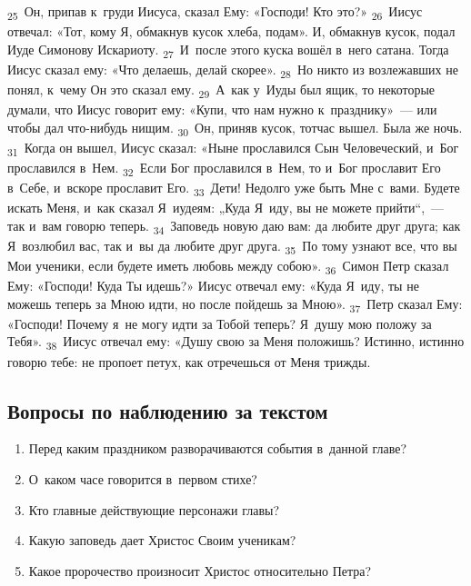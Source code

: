 \documentclass[a4paper,12pt]{article}
\begin{document}
\textsubscript{25}~Он, припав к~груди Иисуса, сказал Ему: «Господи! Кто это?»
\textsubscript{26}~Иисус отвечал: «Тот, кому Я, обмакнув кусок хлеба, подам». И, обмакнув кусок, подал Иуде Симонову Искариоту.
\textsubscript{27}~И~после этого куска вошёл в~него сатана. Тогда Иисус сказал ему: «Что делаешь, делай скорее».
\textsubscript{28}~Но никто из возлежавших не понял, к~чему Он это сказал ему.
\textsubscript{29}~А~как у~Иуды был ящик, то некоторые думали, что Иисус говорит ему: «Купи, что нам нужно к~празднику»~--- или чтобы дал что-нибудь нищим.
\textsubscript{30}~Он, приняв кусок, тотчас вышел. Была же ночь.
\textsubscript{31}~Когда он вышел, Иисус сказал: «Ныне прославился Сын Человеческий, и~Бог прославился в~Нем.
\textsubscript{32}~Если Бог прославился в~Нем, то и~Бог прославит Его в~Себе, и~вскоре прославит Его.
\textsubscript{33}~Дети! Недолго уже быть Мне с~вами. Будете искать Меня, и~как сказал Я~иудеям: „Куда Я~иду, вы не можете прийти“,~--- так и~вам говорю теперь.
\textsubscript{34}~Заповедь новую даю вам: да любите друг друга; как Я~возлюбил вас, так и~вы да любите друг друга.
\textsubscript{35}~По тому узнают все, что вы Мои ученики, если будете иметь любовь между собою».
\textsubscript{36}~Симон Петр сказал Ему: «Господи! Куда Ты идешь?» Иисус отвечал ему: «Куда Я~иду, ты не можешь теперь за Мною идти, но после пойдешь за Мною».
\textsubscript{37}~Петр сказал Ему: «Господи! Почему я~не могу идти за Тобой теперь? Я~душу мою положу за Тебя».
\textsubscript{38}~Иисус отвечал ему: «Душу свою за Меня положишь? Истинно, истинно говорю тебе: не пропоет петух, как отречешься от Меня трижды. 

\subsection*{Вопросы по наблюдению за текстом}
\begin{enumerate}
    \item Перед каким праздником разворачиваются события в~данной главе? 
    
    \myline
    
    \myline
    \item О~каком часе говорится в~первом стихе? 
    
    \myline
    
    \myline
    \item Кто главные действующие персонажи главы? 
    
    \myline
    
    \myline
    \item Какую заповедь дает Христос Своим ученикам? 
    
    \myline
    
    \myline
    \item Какое пророчество произносит Христос относительно Петра? 
\end{enumerate}
\end{document}
